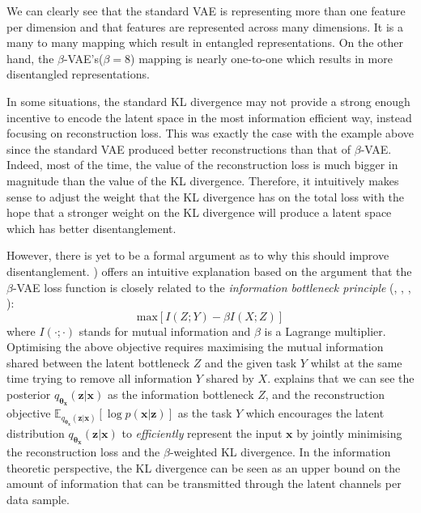             
            We can clearly see that the standard VAE is representing more than one feature per dimension and that features are represented across many dimensions. It is a many to many mapping which result in entangled representations. On the other hand, the $\beta$-VAE's($\beta=8$) mapping is nearly one-to-one which results in more disentangled representations.
            
            In some situations, the standard KL divergence may not provide a strong enough incentive to encode the latent space in the most information efficient way, instead focusing on reconstruction loss. This was exactly the case with the example above since the standard VAE produced better reconstructions than that of $\beta$-VAE. Indeed, most of the time, the value of the reconstruction loss is much bigger in magnitude than the value of the KL divergence. Therefore, it intuitively makes sense to adjust the weight that the KL divergence has on the total loss with the hope that a stronger weight on the KL divergence will produce a latent space which has better disentanglement.
            
            However, there is yet to be a formal argument as to why this should improve disentanglement. \cite{burgess2018understanding}) offers an intuitive explanation based on the argument that the $\beta$-VAE loss function is closely related to the \textit{information bottleneck principle} (\cite{tishby2000information}, \cite{achille2018information}, \cite{alemi2016deep}, \cite{chechik2005information}):
                \[\text{max}[I(Z;Y) - \beta I(X;Z)]\]
            where $I(\cdot; \cdot)$ stands for mutual information and $\beta$ is a Lagrange multiplier. Optimising the above objective requires maximising the mutual information shared between the latent bottleneck $Z$ and the given task $Y$ whilst at the same time trying to remove all information $Y$ shared by $X$. \cite{burgess2018understanding} explains that we can see the posterior $q_{\bm{\theta_x}}(\bm{z}|\bm{x})$ as the information bottleneck $Z$, and the reconstruction objective $\mathbb{E}_{q_{\bm{\theta_x}}(\bm{z}|\bm{x})} \left[\log p(\bm{x} | \bm{z}) \right]$ as the task $Y$ which encourages the latent distribution $q_{\bm{\theta_x}}(\bm{z}|\bm{x})$ to \textit{efficiently} represent the input $\bm{x}$ by jointly minimising the reconstruction loss and the $\beta$-weighted KL divergence. In the information theoretic perspective, the KL divergence can be seen as an upper bound on the amount of information that can be transmitted through the latent channels per data sample.
            
